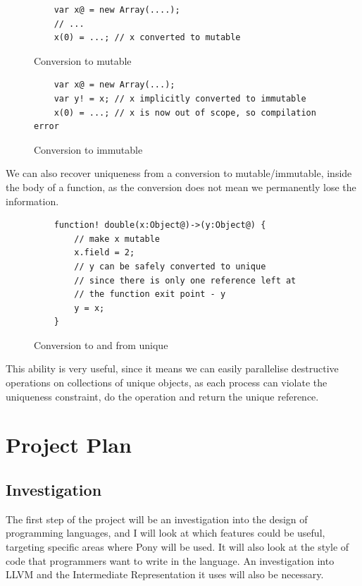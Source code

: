 \documentclass[pdftex,12pt,a4paper]{article}
\begin{document}
\begin{figure}[H]
\begin{verbatim}
    var x@ = new Array(....);
    // ...
    x(0) = ...; // x converted to mutable
\end{verbatim}
\caption{Conversion to mutable}
\end{figure}

\begin{figure}[H]
\begin{verbatim}
    var x@ = new Array(...);
    var y! = x; // x implicitly converted to immutable
    x(0) = ...; // x is now out of scope, so compilation error
\end{verbatim}
\caption{Conversion to immutable}
\end{figure}

We can also recover uniqueness from a conversion to mutable/immutable, inside the body of a function, as the conversion does not mean we permanently lose the information.

\begin{figure}[H]
\begin{verbatim}
    function! double(x:Object@)->(y:Object@) {
        // make x mutable
        x.field = 2;
        // y can be safely converted to unique
        // since there is only one reference left at
        // the function exit point - y
        y = x;
    }
\end{verbatim}
\caption{Conversion to and from unique}
\end{figure}

This ability is very useful, since it means we can easily parallelise destructive operations on collections of unique objects, as each process can violate the uniqueness constraint, do the operation and return the unique reference.

\newpage
\section{Project Plan}

\subsection{Investigation}
The first step of the project will be an investigation into the design of programming languages, and I will look at which features could be useful, targeting specific areas where Pony will be used.
It will also look at the style of code that programmers want to write in the language.
An investigation into LLVM and the Intermediate Representation it uses will also be necessary.
\end{document}
